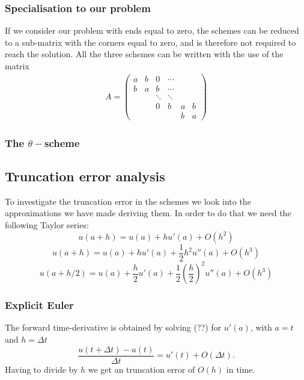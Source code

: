 \documentclass[11pt,a4paper,draft]{article}
\numberwithin{equation}{section}
\begin{document}
\subsubsection{Specialisation to our problem}

If we consider our problem with ends equal to zero, the schemes can 
be reduced to a sub-matrix with the corners equal to zero, and is therefore
not required to reach the solution. All the three schemes can be written 
with the use of the matrix
\begin{gather}
A = 
\begin{pmatrix}
a & b & 0 & \cdots\\
b & a & b & \cdots\\
&&\ddots & \ddots\\
&&0& b& a & b\\
&&&&b&a
\end{pmatrix}
\label{eq:matrixA}
\end{gather}

\subsubsection{The $\theta-$scheme}

\subsection{Truncation error analysis}

To investigate the truncation error in the schemes we look into the approximations we have made deriving them. In order to do that we need the following Taylor series:
\begin{equation}
u(a+h) = u(a) +hu'(a)+O(h^2)
\end{equation}
\begin{equation}
u(a+h) = u(a) +hu'(a)+\frac{1}{2}h^2 u''(a) +O(h^3)
\end{equation}
\begin{equation}
u(a+h/2) = u(a) +\frac{h}{2}u'(a) + \frac{1}{2} \left( \frac{h}{2} \right)^2 u''(a) + O(h^3)
\end{equation}

\subsubsection{Explicit Euler}
The forward time-derivative is obtained by solving (??) for $u'(a)$, with $a=t$ and $h=\Delta t$
\begin{equation}
\frac{u(t+\Delta t)-u(t)}{\Delta t} = u'(t)+O(\Delta t).
\end{equation}  
Having to divide by $h$ we get an truncation error of $O(h)$ in time.
\end{document}
